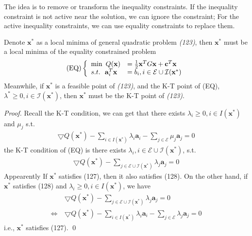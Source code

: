\documentclass[runningheads]{llncs}
\begin{document}
The idea is to remove or transform the inequality constraints.
If the inequality constraint is not active near the solution,
we can ignore the constraint; For the active inequality constraints,
we can use equality constraints to replace them.

\begin{theorem}
    Denote $\mathbf{x}^*$ as a local minima of general quadratic
    problem \emph{(123)}, then $\mathbf{x}^*$ must be a local minima of
    the equality constrained problem
    \begin{align}
        (\textnormal{EQ})\left\{
            \begin{array}{ll}
                \min \ Q(\mathbf{x}) &= \frac{1}{2} \mathbf{x}^T G\mathbf{x}
                + \mathbf{c}^T\mathbf{x} \\
                s.t. \ \ \mathbf{a}_i^T\mathbf{x} &= b_i, i \in \mathcal{E}
                \cup \mathcal{I}(\mathbf{x}^*)
            \end{array}
        \right.
    \end{align}
    Meanwhile, if $\mathbf{x}^*$ is a feasible point of \emph{(123)},
    and the K-T point of (EQ), $\lambda^* \geq 0, i \in \mathcal{I}(\mathbf{x}^*)$,
    then $\mathbf{x}^*$ must be the K-T point of \emph{(123)}.
\end{theorem}
\begin{proof}
    Recall the K-T condition, we can get that
    there exists $\lambda_i \geq 0, i \in I(\mathbf{x}^*)$ and $\mu_j$ s.t.
    \begin{align}
        \bigtriangledown Q(\mathbf{x}^*) - \sum_{i\in I(\mathbf{x}^*)} \lambda_i \mathbf{a}_i
        - \sum_{j \in \mathcal{E}} \mu_j \mathbf{a}_j = 0
    \end{align}
    the K-T condition of (EQ) is there exists $\lambda_i, i \in \mathcal{E} \cup \mathcal{I}(\mathbf{x}^*)$,
    s.t.
    \begin{align}
        \bigtriangledown Q(\mathbf{x}^*)
        - \sum_{j \in \mathcal{E} \cup \mathcal{I}(\mathbf{x}^*)} \lambda_j \mathbf{a}_j = 0
    \end{align}
    Appearently If $\mathbf{x}^*$ satisfies (127), then it also satisfies (128).
    On the other hand, if $\mathbf{x}^*$ satisfies (128) and $\lambda_i \geq 0, i \in I(\mathbf{x}^*)$,
    we have
    \begin{align}
        &\bigtriangledown Q(\mathbf{x}^*)
        - \sum_{j \in \mathcal{E} \cup \mathcal{I}(\mathbf{x}^*)} \lambda_j \mathbf{a}_j = 0 \\
        \Leftrightarrow \ &
        \bigtriangledown Q(\mathbf{x}^*) - \sum_{i\in I(\mathbf{x}^*)} \lambda_i \mathbf{a}_i
        - \sum_{j \in \mathcal{E}} \lambda_j \mathbf{a}_j = 0
    \end{align}
    i.e., $\mathbf{x}^*$ satisfies (127).
    \qed
\end{proof}
\end{document}
